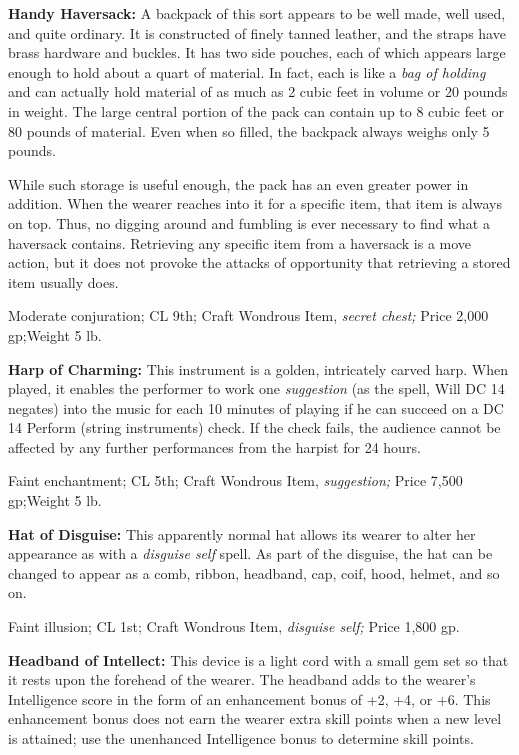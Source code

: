 \documentclass{article}
\begin{document}
\textbf{Handy Haversack:} A backpack of this sort appears to be well made, well 
used, and quite ordinary. It is constructed of finely tanned leather, and the straps 
have brass hardware and buckles. It has two side pouches, each of which appears 
large enough to hold about a quart of material. In fact, each is like a \textit{bag 
of holding }and can actually hold material of as much as 2 cubic feet in volume 
or 20 pounds in weight. The large central portion of the pack can contain up to 
8 cubic feet or 80 pounds of material. Even when so filled, the backpack always 
weighs only 5 pounds.

While such storage is useful enough, the pack has an even greater power in addition. 
When the wearer reaches into it for a specific item, that item is always on top. 
Thus, no digging around and fumbling is ever necessary to find what a haversack 
contains. Retrieving any specific item from a haversack is a move action, but it 
does not provoke the attacks of opportunity that retrieving a stored item usually 
does.

Moderate conjuration; CL 9th; Craft Wondrous Item, \textit{secret chest; }Price 
2,000 gp;Weight 5 lb.

\textbf{Harp of Charming:} This instrument is a golden, intricately carved harp. 
When played, it enables the performer to work one \textit{suggestion }(as the spell, 
Will DC 14 negates) into the music for each 10 minutes of playing if he can succeed 
on a DC 14 Perform (string instruments) check. If the check fails, the audience 
cannot be affected by any further performances from the harpist for 24 hours.

Faint enchantment; CL 5th; Craft Wondrous Item, \textit{suggestion; }Price 7,500 
gp;Weight 5 lb.

\textbf{Hat of Disguise:} This apparently normal hat allows its wearer to alter 
her appearance as with a \textit{disguise self }spell. As part of the disguise, 
the hat can be changed to appear as a comb, ribbon, headband, cap, coif, hood, 
helmet, and so on.

Faint illusion; CL 1st; Craft Wondrous Item, \textit{disguise self; }Price 1,800 
gp.

\textbf{Headband of Intellect:} This device is a light cord with a small gem set 
so that it rests upon the forehead of the wearer. The headband adds to the wearer's 
Intelligence score in the form of an enhancement bonus of +2, +4, or +6. This enhancement 
bonus does not earn the wearer extra skill points when a new level is attained; 
use the unenhanced Intelligence bonus to determine skill points.
\end{document}
